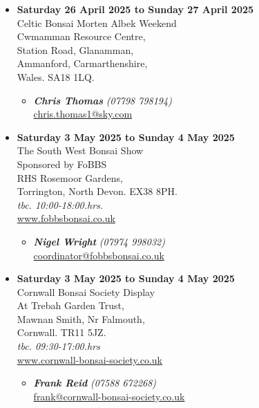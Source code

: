 \begin{itemize}
    \item \textbf{Saturday 26 April 2025 to Sunday 27 April 2025}
    \\
    Celtic Bonsai Morten Albek Weekend \\
    Cwmamman Resource Centre, \\
    Station Road, Glanamman, \\
    Ammanford, Carmarthenshire, \\
    Wales. SA18 1LQ.
    \begin{itemize}
        \item \textbf{\emph{Chris Thomas}} \emph{(07798 798194)} \\
        \href{mailto:chris.thomas1@sky.com}{chris.thomas1@sky.com} 
    \end{itemize}

    \item \textbf{Saturday 3 May 2025 to Sunday 4 May 2025}
    \\
    The South West Bonsai Show \\
    Sponsored by FoBBS \\
    RHS Rosemoor Gardens, \\
    Torrington, North Devon. EX38 8PH.
    \\
    \emph{tbc. 10:00-18:00.hrs.}
    \\
    \href{https://www.fobbsbonsai.co.uk}{www.fobbsbonsai.co.uk}
    \begin{itemize}
        \item \textbf{\emph{Nigel Wright}} \emph{(07974 998032)} \\
        \href{mailto:coordinator@fobbsbonsai.co.uk}{coordinator@fobbsbonsai.co.uk} 
    \end{itemize}

    \item \textbf{Saturday 3 May 2025 to Sunday 4 May 2025}
    \\
    Cornwall Bonsai Society Display \\
    At Trebah Garden Trust, \\
    Mawnan Smith, Nr Falmouth, \\
    Cornwall. TR11 5JZ.
    \\
    \emph{tbc. 09:30-17:00.hrs}
    \\
    \href{https://www.cornwall-bonsai-society.co.uk}{www.cornwall-bonsai-society.co.uk}
    \begin{itemize}
        \item \textbf{\emph{Frank Reid}} \emph{(07588 672268)} \\
        \href{mailto:frank@cornwall-bonsai-society.co.uk}{frank@cornwall-bonsai-society.co.uk} 
    \end{itemize}


\end{itemize}
